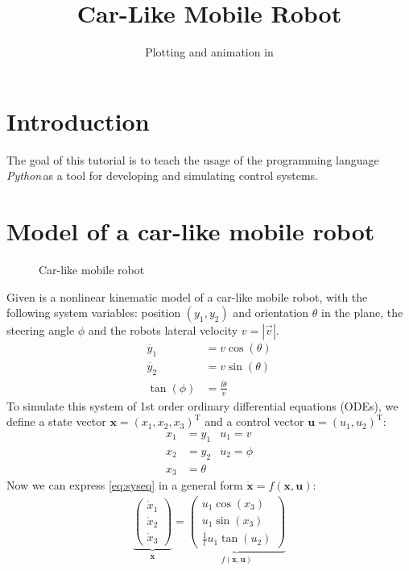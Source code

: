 \documentclass[a4paper,11pt,headings=standardclasses]{scrartcl}%
\title{Car-Like Mobile Robot}
\subtitle{Plotting and animation in \py}%
\author{}
\date{}
\newcommand{\py}{\emph{Python}\,}
\begin{document}
\maketitle%
\tableofcontents
\newpage
\section{Introduction}
The goal of this tutorial is to teach the usage of the programming language \py as a tool for developing and simulating control systems.
\section{Model of a car-like mobile robot}
\begin{figure}[ht]
	\centering
	\def\svgwidth{0.7\textwidth}
	
	\caption{Car-like mobile robot}
	\label{fig:car}
\end{figure}
Given is a nonlinear kinematic model of a car-like mobile robot, with the following system variables: position $(y_1, y_2)$ and orientation $\theta$ in the plane, the steering angle $\phi$ and the robots lateral velocity $v=\left| \vec{v} \right| $. 
\begin{subequations}\label{eq:syseq}
\begin{align}
\dot{y_1}&=v \cos (\theta) \\
\dot{y_2}&=v \sin (\theta) \\
\tan(\phi) &= \frac{l\dot{\theta}}{v}
\end{align}
\end{subequations}
To simulate this system of 1st order ordinary differential equations (ODEs), we define a state vector $\mathbf{x}=(x_1,x_2,x_3)^\mathrm{T}$ and a control vector $\mathbf{u}=(u_1,u_2)^\mathrm{T}$:
\begin{align*}
x_1 &= y_1 & u_1 = v\\
x_2 &= y_2 & u_2 = \phi \\
x_3 &= \theta 
\end{align*}
Now we can express \eqref{eq:syseq} in a general form $\dot{\mathbf{x}}=f(\mathbf{x},\mathbf{u})$:
\label{eq:ss_system}
\begin{align}
\underbrace{\begin{pmatrix} \dot{x}_1 \\ \dot{x}_2 \\ \dot{x}_3 \end{pmatrix}}_{\dot{\mathbf{x}}} = \underbrace{\begin{pmatrix}  u_1 \cos(x_3) \\ u_1 \sin(x_3) \\ \frac{1}{l}u_1 \tan(u_2) \end{pmatrix}}_{f(\mathbf{x},\mathbf{u})}
\end{align}
\end{document}
